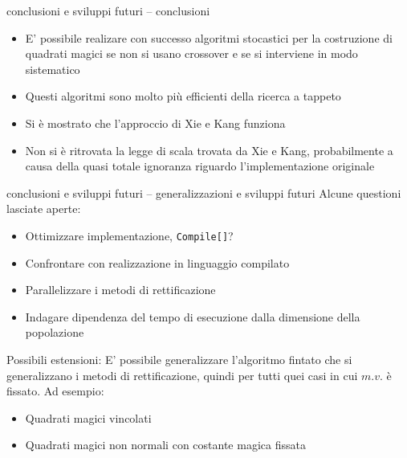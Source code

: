 \documentclass[10pt]{beamer}
\begin{document}

\begin{frame}{conclusioni e sviluppi futuri -- conclusioni}
		\begin{itemize}
			\item \alert{E' possibile} realizare con successo algoritmi stocastici per la costruzione di quadrati magici se non si usano crossover e se si interviene in modo sistematico
			\item Questi algoritmi sono molto più efficienti della ricerca a tappeto
			\item Si è mostrato che l'approccio di Xie e Kang \alert{funziona}
			\item \alert{Non} si è ritrovata la legge di scala trovata da Xie e Kang, probabilmente a causa della quasi totale ignoranza riguardo l'implementazione originale
		\end{itemize}
\end{frame}

\begin{frame}{conclusioni e sviluppi futuri -- generalizzazioni e sviluppi futuri}
	Alcune questioni lasciate aperte:
	\begin{itemize}
		\item Ottimizzare implementazione, \texttt{Compile[]}?
		\item Confrontare con realizzazione in linguaggio compilato
		\item Parallelizzare i metodi di rettificazione
		\item Indagare dipendenza del tempo di esecuzione dalla dimensione della popolazione
	\end{itemize}
	Possibili estensioni:
	E' possibile generalizzare l'algoritmo fintato che si generalizzano i metodi di rettificazione, quindi per tutti quei casi in cui $ m.v. $ è fissato.
	Ad esempio:
	\begin{itemize}
		\item Quadrati magici vincolati
		\item Quadrati magici non normali con costante magica fissata
	\end{itemize}
\end{frame}
\end{document}
